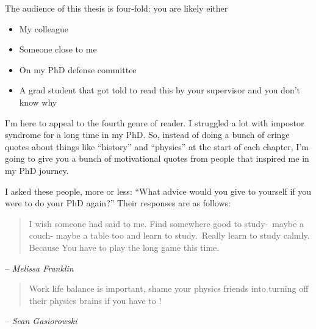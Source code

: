 \documentclass[
  11pt,
  numbers=noendperiod]{book}
\begin{document}
The audience of this thesis is four-fold: you are likely either
\begin{itemize}
    \item My colleague
    \item Someone close to me
    \item On my PhD defense committee
    \item A grad student that got told to read this by your supervisor and you don't know why
\end{itemize}

I'm here to appeal to the fourth genre of reader. I struggled a lot with impostor syndrome for a long time in my PhD. So, instead of doing a bunch of cringe quotes about things like ``history'' and ``physics'' at the start of each chapter, I'm going to give you a bunch of motivational quotes from people that inspired me in my PhD journey.

I asked these people, more or less: ``What advice would you give to yourself if you were to do your PhD again?'' Their responses are as follows:

\begin{quote}
    I wish someone had said to me. Find somewhere good to study- maybe a couch- maybe a table too and learn to study. Really learn to study calmly. Because You have to play the long game this time. 

\end{quote}

\hfill-- \textit{Melissa Franklin}

\begin{quote}
    Work life balance is important, shame your physics friends into turning off their physics brains if you have to !
\end{quote}
\hfill-- \textit{Sean Gasiorowski}
\end{document}

